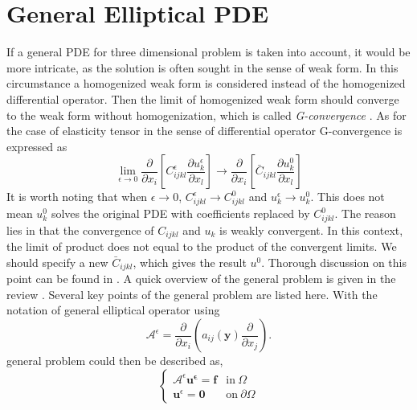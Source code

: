\documentclass[10pt,a4paper]{scrreprt}
\begin{document}
\section{General Elliptical PDE}
\label{sec:pde}
If a general PDE for three dimensional problem is taken into account, it would be more intricate, as the solution is often sought in the sense of weak form. In this circumstance a homogenized weak form is considered instead of the homogenized differential operator. Then the limit of homogenized weak form should converge to the weak form without homogenization, which is called \textit{G-convergence} \citep{hollister1992comparison}. As for the case of elasticity tensor in the sense of differential operator G-convergence is expressed as
\begin{equation}
\label{eq: G conv}
\lim_{\epsilon \to 0} \dfrac{\partial}{\partial x_{i}} \left[ C^{\epsilon}_{ijkl} \dfrac{\partial u^{\epsilon}_{k}}{\partial x_{l}} \right] \rightarrow \dfrac{\partial}{\partial x_{i}} \left[ \bar{C}_{ijkl} \dfrac{\partial u_{k}^{0}}{\partial x_{l}} \right]
\end{equation}
It is worth noting that when $\epsilon \to 0$, $C^{\epsilon}_{ijkl} \to C^{0}_{ijkl}$ and $u^{\epsilon}_{k} \to u^{0}_{k}$. This does not mean $u^{0}_{k}$ solves the original PDE with coefficients replaced by $C^{0}_{ijkl}$. The reason lies in that the convergence of $C_{ijkl}$ and $u_{k}$ is weakly convergent. In this context, the limit of product does not equal to the product of the convergent limits. We should specify a new $\bar{C}_{ijkl}$, which gives the result $u^{0}$. Thorough discussion on this point can be found in \citep{cioranescu_introduction_2000}. A quick overview of the general problem is given in the review \citep{hassani1998review}. Several key points of the general problem are listed here. With the notation of general elliptical operator using 
\begin{equation}
\mathcal{A}^{\epsilon} = \dfrac{\partial}{\partial x_{i}} \left( a_{ij}(\mathbf{y}) \dfrac{\partial}{\partial x_{j}} \right).
\end{equation}
general problem could then be described as,
\begin{equation}
\left\{
\begin{array}{ll}
\mathcal{A}^{\epsilon} \mathbf{u^{\epsilon}}= \mathbf{f} & \text{in} \ \Omega \\
\mathbf{u}^{\epsilon} = \mathbf{0} & \text{on} \ \partial \Omega
\end{array}
\right.
\end{equation}
\end{document}
